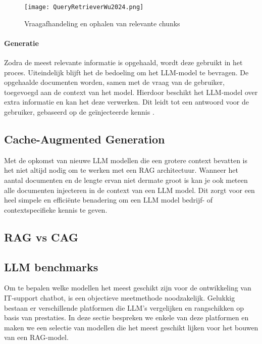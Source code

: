             
    \begin{figure}[H]
        \centering
        \texttt{[image: QueryRetrieverWu2024.png]}
        \caption{Vraagafhandeling en ophalen van relevante chunks \cite{Wu2024}}
        \label{fig:RAG bevragen vector database}
    \end{figure}
    
    \paragraph{Generatie}
    
    Zodra de meest relevante informatie is opgehaald, wordt deze gebruikt in het proces. Uiteindelijk blijft het de bedoeling om het LLM-model te bevragen. De opgehaalde documenten worden, samen met de vraag van de gebruiker, toegevoegd aan de context van het model. Hierdoor beschikt het LLM-model over extra informatie en kan het deze verwerken. Dit leidt tot een antwoord voor de gebruiker, gebaseerd op de geïnjecteerde kennis \autocite{Zhao2024}.
    
    \subsection{Cache-Augmented Generation}
    
    Met de opkomst van nieuwe LLM modellen die een grotere context bevatten is het niet altijd nodig om te werken met een RAG architectuur. Wanneer het aantal documenten en de lengte ervan niet dermate groot is kan je ook meteen alle documenten injecteren in de context van een LLM model. Dit zorgt voor een heel simpele en efficiënte benadering om een LLM model bedrijf- of contextspecifieke kennis te geven.
    
    \subsection{RAG vs CAG}
    
    
    \subsection{LLM benchmarks}
    Om te bepalen welke modellen het meest geschikt zijn voor de ontwikkeling van IT-support chatbot, is een objectieve meetmethode noodzakelijk. Gelukkig bestaan er verschillende platformen die LLM's vergelijken en rangschikken op basis van prestaties. In deze sectie bespreken we enkele van deze platformen en maken we een selectie van modellen die het meest geschikt lijken voor het bouwen van een RAG-model.
       

